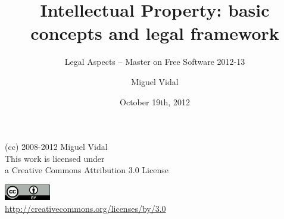 \documentclass{beamer}
\begin{document}
\title{Intellectual Property: basic concepts and legal framework}
\subtitle{Legal Aspects -- Master on Free Software 2012-13}
\author{Miguel Vidal} 
\date{October 19th, 2012}


\begin{frame}
  \vspace{2cm}
  \begin{flushright}
    {\small (cc) 2008-2012 Miguel Vidal} \\
    \medskip
    {\scriptsize This work is licensed under \\ a Creative Commons Attribution 3.0 License}
  \end{flushright}
  \begin{flushright}
    \href{http://creativecommons.org/licenses/by/3.0}{\includegraphics[width=2cm]{format/cc-by.png}} \\
    {\tiny \url{http://creativecommons.org/licenses/by/3.0}}
  \end{flushright}
\end{frame}%

\usebackgroundtemplate{}

\end{document}
